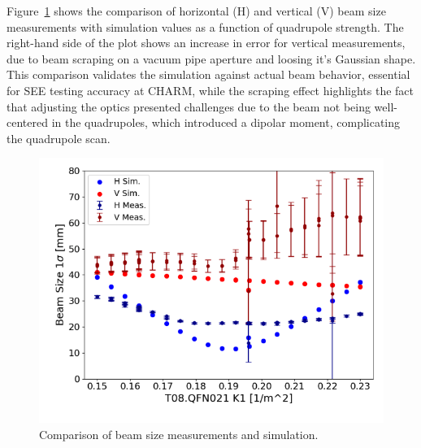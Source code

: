 \documentclass[a4paper,
               biblatex,     %
               ]{jacow}
\begin{document}



Figure~\ref{fig:diff_beam_size} shows the comparison of horizontal (H) and vertical (V) beam size measurements with simulation values as a function of quadrupole strength. The right-hand side of the plot shows an increase in error for vertical measurements, due to beam scraping on a vacuum pipe aperture and loosing it's Gaussian shape. This comparison validates the simulation against actual beam behavior, essential for SEE testing accuracy at CHARM, while the scraping effect highlights the fact that adjusting the optics presented challenges due to the beam not being well-centered in the quadrupoles, which introduced a dipolar moment, complicating the quadrupole scan.

\begin{figure}[!htb]
   \centering
   \includegraphics*[width=0.9\columnwidth]{beam_size_comparison.png}
   \caption{Comparison of beam size measurements and simulation.}
   \label{fig:diff_beam_size}
\end{figure}
\end{document}
